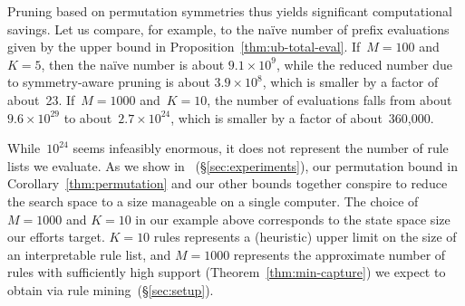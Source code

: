 Pruning based on permutation symmetries thus yields significant
computational savings.
%
Let us compare, for example, to the na\"ive number of prefix evaluations
given by the upper bound in Proposition~\ref{thm:ub-total-eval}.
%
If~${M = 100}$ and~${K = 5}$, then the na\"ive number is about
${9.1 \times 10^9}$, while the reduced number due to symmetry-aware
pruning is about ${3.9 \times 10^8}$,
which is smaller by a factor of about~23.
%
If~${M=1000}$ and~${K = 10}$, the number of evaluations falls from
about~${9.6 \times 10^{29}}$ to about~${2.7 \times 10^{24}}$,
which is smaller by a factor of about~360,000.
%
\begin{arxiv}

\end{arxiv}
\begin{kdd}
%
\end{kdd}
While~$10^{24}$ seems infeasibly enormous,
it does not represent the number of rule lists we evaluate.
%
As we show in ~(\S\ref{sec:experiments}),
our permutation bound in Corollary~\ref{thm:permutation}
and our other bounds together conspire to reduce the search space
to a size manageable on a single computer.
%
The choice of ${M=1000}$ and ${K=10}$ in our example above
corresponds to the state space size our efforts target.
%
${K=10}$ rules represents a (heuristic) upper limit on
the size of an interpretable rule list,
and ${M=1000}$ represents the approximate number of rules
with sufficiently high support (Theorem~\ref{thm:min-capture})
we expect to obtain via rule mining~(\S\ref{sec:setup}).

